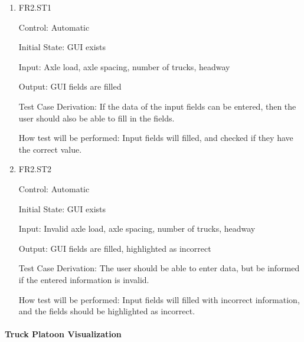 \documentclass[12pt, titlepage]{article}
\begin{document}
\begin{enumerate}

  \item{FR2.ST1\\}

  Control: Automatic

  Initial State: GUI exists

  Input: Axle load, axle spacing, number of trucks, headway

  Output: GUI fields are filled

  Test Case Derivation: If the data of the input fields can be entered, then the user
  should also be able to fill in the fields.

  How test will be performed: Input fields will filled, and checked if they have the
  correct value.

  \item{FR2.ST2\\}

  Control: Automatic

  Initial State: GUI exists

  Input: Invalid axle load, axle spacing, number of trucks, headway

  Output: GUI fields are filled, highlighted as incorrect

  Test Case Derivation: The user should be able to enter data, but be informed if the
  entered information is invalid.

  How test will be performed: Input fields will filled with incorrect information, 
  and the fields should be highlighted as incorrect.

\end{enumerate}

\paragraph{Truck Platoon Visualization}
\end{document}
